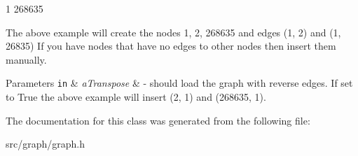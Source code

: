 1 268635

The above example will create the nodes 1, 2, 268635 and edges (1, 2) and (1, 26835) If you have nodes that have no edges to other nodes then insert them manually. 
\begin{DoxyParams}[1]{Parameters}
\mbox{\tt in}  & {\em a\+Transpose} & -\/ should load the graph with reverse edges. If set to True the above example will insert (2, 1) and (268635, 1). \\
\hline
\end{DoxyParams}


The documentation for this class was generated from the following file\+:\begin{DoxyCompactItemize}
\item 
src/graph/graph.\+h\end{DoxyCompactItemize}
